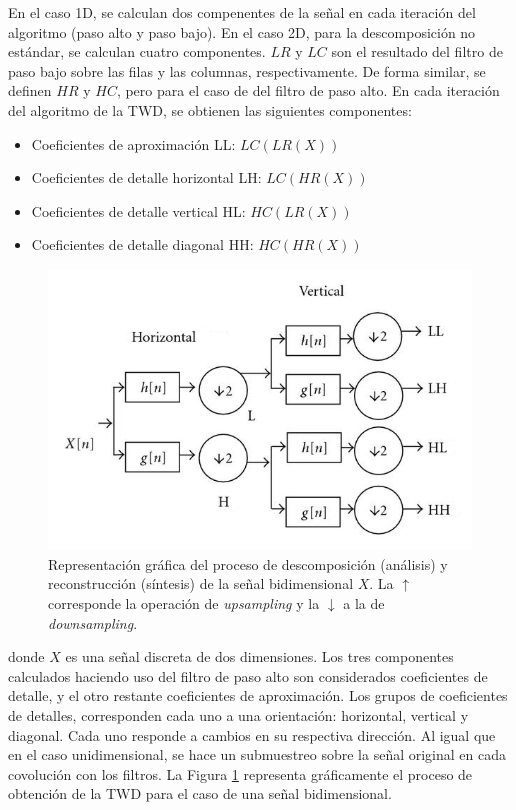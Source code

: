 En el caso 1D, se calculan dos compenentes de la señal en cada iteración del algoritmo (paso alto y
paso bajo). En el caso 2D, para la descomposición no estándar, se calculan cuatro componentes. $LR$ y $LC$ son 
el resultado del filtro de paso bajo
sobre las filas y las columnas, respectivamente. De forma similar, se definen $HR$ y $HC$, pero para el caso de
del filtro de paso alto. En cada iteración del algoritmo de la TWD, se obtienen las siguientes componentes:

\begin{itemize}
	\item Coeficientes de aproximación LL: $LC(LR(X))$
	\item Coeficientes de detalle horizontal LH: $LC(HR(X))$
	\item Coeficientes de detalle vertical HL: $HC(LR(X))$ 
	\item Coeficientes de detalle diagonal HH: $HC(HR(X))$
\end{itemize}

\begin{figure}
	\begin{center}
		\includegraphics[scale=2]{Graphics/dwt-2D.png}
		\caption{Representación gráfica del proceso de descomposición (análisis) y reconstrucción (síntesis) de la señal bidimensional $X$. La $\uparrow$ corresponde la operación de \textit{upsampling} y la $\downarrow$ a la de \textit{downsampling}. }\label{fig:dwt-2D}
	\end{center}
\end{figure}

\noindent donde $X$ es una señal discreta de dos dimensiones. Los tres componentes calculados haciendo uso del 
filtro de paso alto son considerados coeficientes de detalle, y el otro restante coeficientes de aproximación. 
Los grupos de coeficientes de
detalles, corresponden cada uno a una orientación: horizontal, vertical y diagonal. Cada uno responde a cambios en su
respectiva dirección. Al igual que en el caso unidimensional, se hace un submuestreo sobre la señal original
en cada covolución con los filtros. La Figura \ref{fig:dwt-2D} representa gráficamente
el proceso de obtención de la TWD para el caso de una señal bidimensional.

